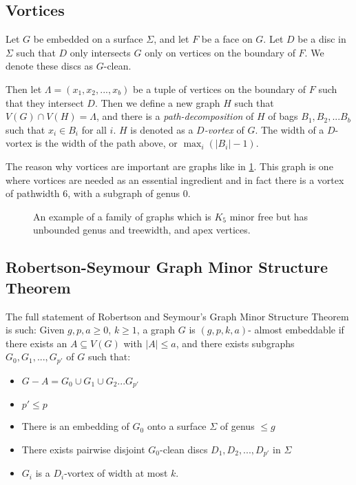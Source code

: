 \subsection{Vortices}\label{sssec:vortices}
Let $G$ be embedded on a surface $\Sigma$, and let $F$ be a face on $G$. Let $D$ be a disc in $\Sigma$ such that $D$ only intersects $G$ only on vertices on the boundary of $F$. We denote these discs as $G$-clean. 

Then let $\Lambda = (x_1, x_2, ..., x_b)$ be a tuple of vertices on the boundary of $F$ such that they intersect $D$. Then we define a new graph $H$ such that $V(G) \cap V(H) = \Lambda$, and there is a \textit{path-decomposition} of $H$ of bags $B_1, B_2, ... B_b$ such that $x_i \in B_i$ for all $i$. $H$ is denoted as a \textit{$D$-vortex} of $G$. The width of a $D$-vortex is the width of the path above, or $\max_i(|B_i| - 1)$. 

The reason why vortices are important are graphs like in \cref{fig:tenniscourt}. This graph is one where vortices are needed as an essential ingredient and in fact there is a vortex of pathwidth 6, with a subgraph of genus 0.

\begin{figure}[h]
	\centering
	
	\caption{An example of a family of graphs which is $K_5$ minor free but has unbounded genus and treewidth, and apex vertices. }
	\label{fig:tenniscourt}
\end{figure}
\subsection{Robertson-Seymour Graph Minor Structure Theorem}\label{ssec:Robertson_Seymour_Graph_Structure}
The full statement of Robertson and Seymour's Graph Minor Structure Theorem \cite{robertsonGraphMinorsXVI2003}is such:
Given $g, p, a \geq 0$, $k \geq 1$, a graph $G$ is $(g, p, k, a)$- almost embeddable if there exists an $A \subseteq V(G)$ with $|A| \leq a$, and there exists subgraphs $G_0, G_1, ...,  G_{p'}$ of $G$ such that:
\begin{itemize}
	\item $G - A = G_0 \cup G_1 \cup G_2 ... G_{p'}$
	\item $p' \leq p$
	\item There is an embedding of $G_0$ onto a surface $\Sigma$ of genus $\leq g$
	\item There exists pairwise disjoint $G_0$-clean discs $D_1, D_2, ..., D_{p'}$ in $\Sigma$
	\item $G_i$ is a $D_i$-vortex of width at most $k$.
\end{itemize}


